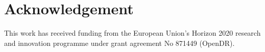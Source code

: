 \section*{Acknowledgement}
This work has received funding from the European Union’s Horizon 2020 research and innovation programme under grant agreement No 871449 (OpenDR). 
